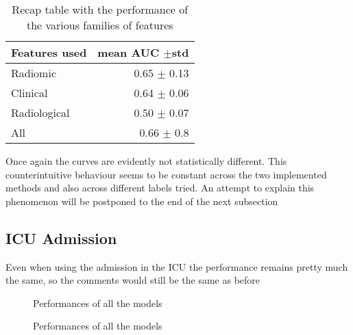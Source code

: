 \begin{table}
\caption{Recap table with the performance of the various families of features \label{tab:RecapDeathRF}}
\centering
\begin{tabular}{l|r}
\toprule
Features used & mean AUC $\pm$std\\
\midrule
Radiomic  & 0.65 $\pm$ 0.13\\
Clinical  &  0.64 $\pm$ 0.06\\
Radiological & 0.50 $\pm$ 0.07\\
All & 0.66 $\pm$ 0.8 \\
\bottomrule
\end{tabular}
\end{table}

Once again the curves are evidently not statistically different. This counterintuitive behaviour seems to be constant across the two implemented methods and also across different labels tried. An attempt to explain this phenomenon will be postponed to the end of the next subsection
\subsection{ICU Admission}
Even when using the admission in the ICU the performance remains pretty much the same, so the comments would still be the same as before

\begin{figure}[H]
\centering
	\newline
        \caption{Performances of all the models}\label{fig:RFicu}
\end{figure}


\begin{figure}[H]
\centering
	\newline
        \caption{Performances of all the models}\label{fig:RFicuROC}
\end{figure}



